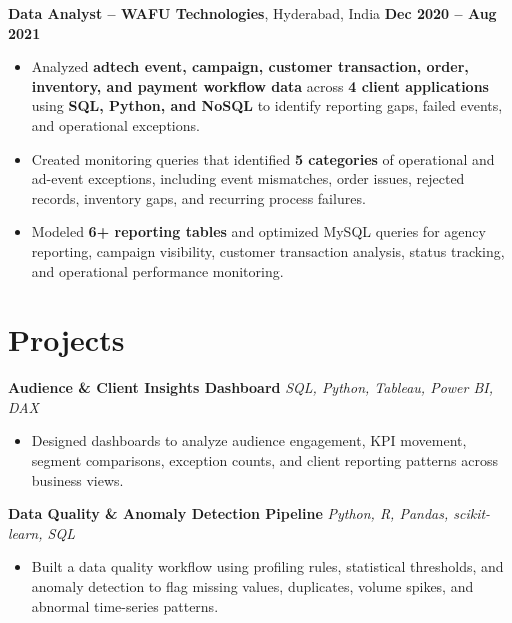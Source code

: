 \documentclass[letterpaper,11pt]{article}
\begin{document}
\vspace{1pt}

\textbf{Data Analyst -- WAFU Technologies}, Hyderabad, India \hfill \textbf{Dec 2020 -- Aug 2021}\\[-1pt]
\begin{itemize}
    \item Analyzed \textbf{adtech event, campaign, customer transaction, order, inventory, and payment workflow data} across \textbf{4 client applications} using \textbf{SQL, Python, and NoSQL} to identify reporting gaps, failed events, and operational exceptions.
    \item Created monitoring queries that identified \textbf{5 categories} of operational and ad-event exceptions, including event mismatches, order issues, rejected records, inventory gaps, and recurring process failures.
    \item Modeled \textbf{6+ reporting tables} and optimized MySQL queries for agency reporting, campaign visibility, customer transaction analysis, status tracking, and operational performance monitoring.
\end{itemize}

\section*{Projects}

\textbf{Audience \& Client Insights Dashboard} \hfill \textit{SQL, Python, Tableau, Power BI, DAX}\\[-1pt]
\begin{itemize}
    \item Designed dashboards to analyze audience engagement, KPI movement, segment comparisons, exception counts, and client reporting patterns across business views.
\end{itemize}

\vspace{1pt}

\textbf{Data Quality \& Anomaly Detection Pipeline} \hfill \textit{Python, R, Pandas, scikit-learn, SQL}\\[-1pt]
\begin{itemize}
    \item Built a data quality workflow using profiling rules, statistical thresholds, and anomaly detection to flag missing values, duplicates, volume spikes, and abnormal time-series patterns.
\end{itemize}

\vspace{1pt}
\end{document}
